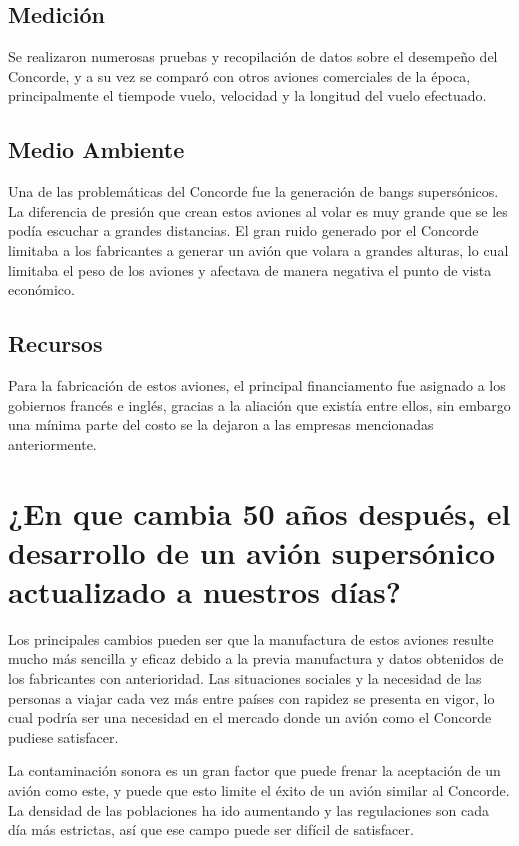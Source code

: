 \documentclass[12pt, letterpaper]{article}
\begin{document}
\subsection*{Medición}
Se realizaron numerosas pruebas y recopilación de datos sobre el desempeño del Concorde, y a su vez se comparó con otros aviones comerciales de la época, principalmente el tiempode vuelo, velocidad y la longitud del vuelo efectuado.

\subsection*{Medio Ambiente}
Una de las problemáticas del Concorde fue la generación de bangs supersónicos. La diferencia de presión que crean estos aviones al volar es muy grande que se les podía escuchar a grandes distancias. El gran ruido generado por el Concorde limitaba a los fabricantes a generar un avión que volara a grandes alturas, lo cual limitaba el peso de los aviones y afectava de manera negativa el punto de vista económico.

\subsection*{Recursos}
Para la fabricación de estos aviones, el principal financiamento fue asignado a los gobiernos francés e inglés, gracias a la aliación que existía entre ellos, sin embargo una mínima parte del costo se la dejaron a las empresas mencionadas anteriormente.

\section*{¿En que cambia 50 años después, el desarrollo de un avión supersónico actualizado a nuestros días?}
Los principales cambios pueden ser que la manufactura de estos aviones resulte mucho más sencilla y eficaz debido a la previa manufactura y datos obtenidos de los fabricantes con anterioridad. Las situaciones sociales y la necesidad de las personas a viajar cada vez más entre países con rapidez se presenta en vigor, lo cual podría ser una necesidad en el mercado donde un avión como el Concorde pudiese satisfacer.

La contaminación sonora es un gran factor que puede frenar la aceptación de un avión como este, y puede que esto limite el éxito de un avión similar al Concorde. La densidad de las poblaciones ha ido aumentando y las regulaciones son cada día más estrictas, así que ese campo puede ser difícil de satisfacer.
\renewcommand\refname{References}
\printbibliography
\end{document}
